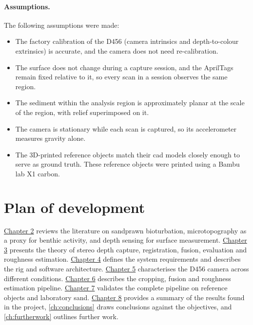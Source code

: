 \paragraph{Assumptions.} The following assumptions were made:
\begin{itemize}
	\item The factory calibration of the D456 (camera intrinsics and depth-to-colour extrinsics) is accurate, and the camera does not need re-calibration.
	
	\item The surface does not change during a capture session, and the AprilTags remain fixed relative to it, so every scan in a session observes the same region.
	
	\item The sediment within the analysis region is approximately planar at the scale of the region, with relief superimposed on it.
	
	\item The camera is stationary while each scan is captured, so its accelerometer measures gravity alone.
	
	\item The 3D-printed reference objects match their \gls{cad} models closely enough to serve as ground truth. These reference objects were printed using a Bambu lab X1 carbon.
\end{itemize}

\section{Plan of development}
\label{sec:ch1.planofdevelopment}
\hyperref[ch:review]{Chapter 2} reviews the literature on sandprawn bioturbation, microtopography as a proxy for benthic activity, and depth sensing for surface measurement. \hyperref[ch:theory]{Chapter 3} presents the theory of stereo depth capture, \gls{registration}, \gls{fusion}, evaluation and roughness estimation. \hyperref[ch:design]{Chapter 4} defines the system requirements and describes the rig and software architecture. \hyperref[ch:experiments]{Chapter 5} characterises the D456 camera across different conditions. \hyperref[ch:Pipeline]{Chapter 6} describes the cropping, fusion and roughness estimation pipeline. \hyperref[ch:Validation]{Chapter 7} validates the complete pipeline on reference objects and laboratory sand. \hyperref[ch:discussion]{Chapter 8} provides a summary of the results found in the project, \autoref{ch:conclusions} draws conclusions against the objectives, and \autoref{ch:furtherwork} outlines further work.
